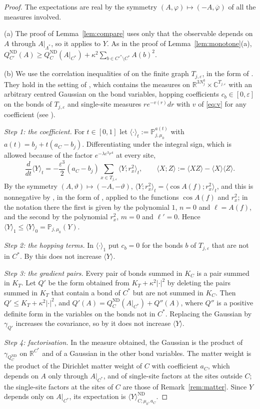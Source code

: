 \documentclass[11pt]{amsart}
\theoremstyle{plain}
\theoremstyle{definition}
\theoremstyle{remark}
\numberwithin{equation}{section}
\newcommand{\R}{\mathbb{R}}
\newcommand{\C}{\mathbb{C}}
\newcommand{\eps}{\varepsilon}
\newcommand{\abs}[1]{\lvert #1\rvert}
\newcommand{\ev}[1]{\langle #1\rangle}
\begin{document}
\begin{proof}
The expectations are real by the symmetry $(A,\varphi)\mapsto(-A,\overline\varphi)$ of all the measures involved.

(a) The proof of Lemma~\ref{lem:compare} uses only that the observable depends on $A$ through $A|_{\Lambda^*}$, so it applies to $Y$. As in the proof of Lemma~\ref{lem:monotone}(a), $Q^{\mathrm{ND}}_{C'}(A)\ge Q^{\mathrm{ND}}_C(A|_{C^*})+\kappa^2\sum_{b\in C'^*\setminus C^*}A(b)^2$.

(b) We use the correlation inequalities of \cite[Sect.~6]{BFS1} on the finite graph $T_{j,\eps}$, in the form of \cite[Lemmas~B.10--B.12]{v1}. They hold in the setting of \cite[Def.~B.8]{v1}, which contains the measures on $\R^{3N_j^3}\times\C^{T_{j,\eps}}$ with an arbitrary centred Gaussian on the bond variables, hopping coefficients $c_b\in[0,\eps]$ on the bonds of $T_{j,\eps}$ and single-site measures $re^{-v(r)}dr$ with $v$ of \eqref{eq:v} for any coefficient (see \cite[Prop.~B.13]{v1}).

\emph{Step 1: the coefficient.} For $t\in[0,1]$ let $\ev\cdot_t:=\mathbb P^{a(t)}_{j,\mu_0}$ with $a(t)=b_j+t(a_C-b_j)$. Differentiating under the integral sign, which is allowed because of the factor $e^{-\lambda\eps^3r^4}$ at every site,
\[
\frac{d}{dt}\ev Y_t=-\frac{\eps^3}2(a_C-b_j)\sum_{x\in T_{j,\eps}}\ev{Y;r_x^2}_t ,\qquad\ev{X;Z}:=\ev{XZ}-\ev X\ev Z .
\]
By the symmetry $(A,\vartheta)\mapsto(-A,-\vartheta)$, $\ev{Y;r_x^2}_t=\ev{\cos A(f);r_x^2}_t$, and this is nonnegative by \cite[Thm.~6.1, p.~276]{BFS1}, in the form of \cite[Lemma~B.10]{v1}, applied to the functions $\cos A(f)$ and $r_x^2$; in the notation there the first is given by the polynomial $1$, $n=0$ and $\ell=A(f)$, and the second by the polynomial $r_x^2$, $m=0$ and $\ell'=0$. Hence $\ev Y_1\le\ev Y_0=\mathbb P_{j,\mu_0}(Y)$.

\emph{Step 2: the hopping terms.} In $\ev\cdot_1$ put $c_b=0$ for the bonds $b$ of $T_{j,\eps}$ that are not in $C^*$. By \cite[Lemma~B.12(b)]{v1} this does not increase $\ev Y$.

\emph{Step 3: the gradient pairs.} Every pair of bonds summed in $K_C$ is a pair summed in $K_T$. Let $Q'$ be the form obtained from $K_T+\kappa^2\abs\cdot^2$ by deleting the pairs summed in $K_T$ that contain a bond of $C^*$ but are not summed in $K_C$. Then $Q'\le K_T+\kappa^2\abs\cdot^2$, and $Q'(A)=Q^{\mathrm{ND}}_C(A|_{C^*})+Q''(A)$, where $Q''$ is a positive definite form in the variables on the bonds not in $C^*$. Replacing the Gaussian by $\gamma_{Q'}$ increases the covariance, so by \cite[Lemma~B.12(a)]{v1} it does not increase $\ev Y$.

\emph{Step 4: factorisation.} In the measure obtained, the Gaussian is the product of $\gamma_{Q^{\mathrm{ND}}_C}$ on $\R^{C^*}$ and of a Gaussian in the other bond variables. The matter weight is the product of the Dirichlet matter weight of $C$ with coefficient $a_C$, which depends on $A$ only through $A|_{C^*}$, and of single-site factors at the sites outside $C$; the single-site factors at the sites of $C$ are those of Remark~\ref{rem:matter}. Since $Y$ depends only on $A|_{C^*}$, its expectation is $\ev Y^{\mathrm{ND}}_{C;\mu_0,a_C}$.
\end{proof}
\end{document}
